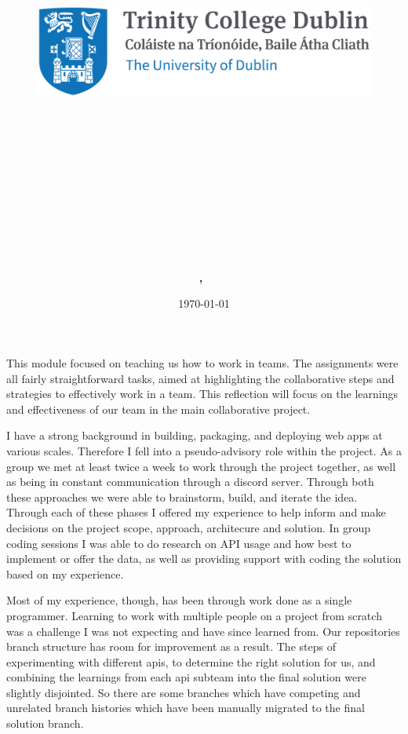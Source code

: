 \documentclass{article}
\title{
\vspace{-1in}
\begin{figure}[!ht]
\flushleft
\includegraphics[width=0.4\linewidth]{reduced-trinity.png}
\end{figure}
\vspace{-0.5cm}
\hrulefill \\
\vspace{0.5cm}
\textmd{\textbf{\moduleCode\ \moduleName}}\\
\textmd{\textbf{\assignmentTitle}}\\
\vspace{0.5cm}
\hrulefill \\
}
\author{\textbf{\authorName,\ \authorID}}
\date{\today}
\begin{document}
\captionsetup{width=.8\linewidth} 

\maketitle
\vspace{0.5in}

This module focused on teaching us how to work in teams. The assignments were all fairly straightforward tasks, aimed at highlighting the collaborative steps and strategies to effectively work in a team. This reflection will focus on the learnings and effectiveness of our team in the main collaborative project.


I have a strong background in building, packaging, and deploying web apps at various scales. Therefore I fell into a pseudo-advisory role within the project. As a group we met at least twice a week to work through the project together, as well as being in constant communication through a discord server. Through both these approaches we were able to brainstorm, build, and iterate the idea. Through each of these phases I offered my experience to help inform and make decisions on the project scope, approach, architecure and solution. In group coding sessions I was able to do research on API usage and how best to implement or offer the data, as well as providing support with coding the solution based on my experience.

Most of my experience, though, has been through work done as a single programmer. Learning to work with multiple people on a project from scratch was a challenge I was not expecting and have since learned from. Our repositories branch structure has room for improvement as a result. The steps of experimenting with different apis, to determine the right solution for us, and combining the learnings from each api subteam into the final solution were slightly disjointed. So there are some branches which have competing and unrelated branch histories which have been manually migrated to the final solution branch. 
\end{document}
